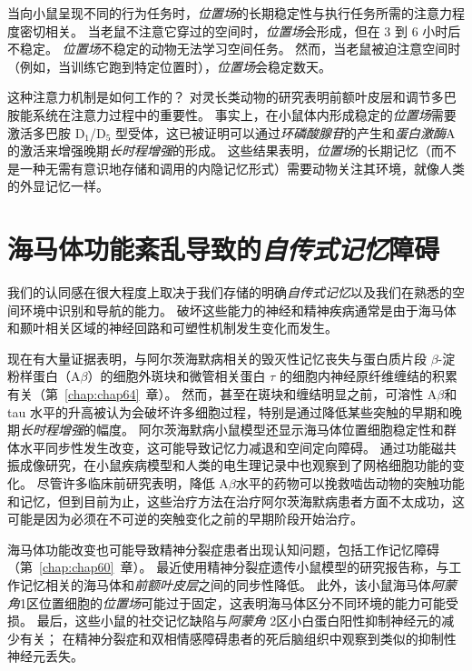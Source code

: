 当向小鼠呈现不同的行为任务时，\textit{位置场}的长期稳定性与执行任务所需的注意力程度密切相关。
当老鼠不注意它穿过的空间时，\textit{位置场}会形成，但在 3 到 6 小时后不稳定。
\textit{位置场}不稳定的动物无法学习空间任务。
然而，当老鼠被迫注意空间时（例如，当训练它跑到特定位置时），\textit{位置场}会稳定数天。


这种注意力机制是如何工作的？
对灵长类动物的研究表明前额叶皮层和调节多巴胺能系统在注意力过程中的重要性。
事实上，在小鼠体内形成稳定的\textit{位置场}需要激活多巴胺 D$_1$/D$_5$ 型受体，这已被证明可以通过\textit{环磷酸腺苷}的产生和\textit{蛋白激酶}A的激活来增强晚期\textit{长时程增强}的形成。
这些结果表明，\textit{位置场}的长期记忆（而不是一种无需有意识地存储和调用的内隐记忆形式）需要动物关注其环境，就像人类的外显记忆一样。



\section{海马体功能紊乱导致的\textit{自传式记忆}障碍}

我们的认同感在很大程度上取决于我们存储的明确\textit{自传式记忆}以及我们在熟悉的空间环境中识别和导航的能力。
破坏这些能力的神经和精神疾病通常是由于海马体和颞叶相关区域的神经回路和可塑性机制发生变化而发生。


现在有大量证据表明，与阿尔茨海默病相关的毁灭性记忆丧失与蛋白质片段 $\beta$-淀粉样蛋白（A$\beta$）的细胞外斑块和微管相关蛋白 $ \tau $ 的细胞内神经原纤维缠结的积累有关（第~\ref{chap:chap64}~章）。
然而，甚至在斑块和缠结明显之前，可溶性 A$\beta$和 tau 水平的升高被认为会破坏许多细胞过程，特别是通过降低某些突触的早期和晚期\textit{长时程增强}的幅度。
阿尔茨海默病小鼠模型还显示海马体位置细胞稳定性和群体水平同步性发生改变，这可能导致记忆力减退和空间定向障碍。
通过功能磁共振成像研究，在小鼠疾病模型和人类的电生理记录中也观察到了网格细胞功能的变化。
尽管许多临床前研究表明，降低 A$\beta$水平的药物可以挽救啮齿动物的突触功能和记忆，但到目前为止，这些治疗方法在治疗阿尔茨海默病患者方面不太成功，这可能是因为必须在不可逆的突触变化之前的早期阶段开始治疗。


海马体功能改变也可能导致精神分裂症患者出现认知问题，包括工作记忆障碍（第~\ref{chap:chap60}~章）。
最近使用精神分裂症遗传小鼠模型的研究报告称，与工作记忆相关的海马体和\textit{前额叶皮层}之间的同步性降低。
此外，该小鼠海马体\textit{阿蒙角}1区位置细胞的\textit{位置场}可能过于固定，这表明海马体区分不同环境的能力可能受损。
最后，这些小鼠的社交记忆缺陷与\textit{阿蒙角} 2区小白蛋白阳性抑制神经元的减少有关；
在精神分裂症和双相情感障碍患者的死后脑组织中观察到类似的抑制性神经元丢失。


